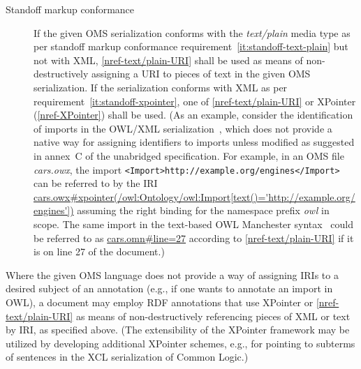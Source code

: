 \documentclass[10pt, a4paper]{isov2}
\makeatletter
\def\cleardoublepage{\clearpage%
        \if@twoside
            \ifodd\c@page\else
                \vspace*{\fill}
                \hfill
                \begin{center}
					
                \end{center}
                \vspace{\fill}
                \thispagestyle{empty}
                \newpage
                \if@twocolumn\hbox{}\newpage\fi
            \fi
        \fi
    }
\newcommand*{\eg}{e.g.,\@\xspace}
\newcommand*{\mimetype}[1]{\textit{#1}}
\newcommand*{\DOL}{\ensuremath{\mathsf{DOL}}\xspace}
\renewcommand{\noterefname}{note}
\renewcommand{\nref}[1]{\noterefname~\ref{#1}}
\renewcommand{\nref}[1]{\ref{nref-#1}}
\makeatother
\begin{document}
\begin{description}
\item[Standoff markup conformance] If the given OMS serialization conforms with the \mimetype{text/plain} media type as per standoff markup conformance requirement~\ref{it:standoff-text-plain} but not with XML, \nref{text/plain-URI} shall be used as means of non-destructively assigning a URI to pieces of text in the given OMS serialization.
If the serialization conforms with XML as per requirement~\ref{it:standoff-xpointer}, one of \nref{text/plain-URI} or XPointer (\nref{XPointer}) shall be used. { (As an example, consider the identification of imports in the OWL/XML serialization~\cite{W3C:owl2-xml-serialization}, which does not provide a native way for assigning identifiers to imports unless modified as suggested in annex~C of the unabridged specification.  For example, in an OMS file \textit{cars.owx}, the import \texttt{<Import>http://example.org/engines</Import>} can be referred to by the IRI \url{cars.owx\#xpointer(/owl:Ontology/owl:Import[text()='http://example.org/engines'])} assuming the right binding for the namespace prefix \textit{owl} in scope.
The same import in the text-based OWL Manchester syntax~\cite{W3C:owl2-manchester-syntax} could be referred to as \url{cars.omn\#line=27} according to \nref{text/plain-URI} if it is on line 27 of the document.)}
\end{description}

Where the given OMS language does not provide a way of assigning IRIs to a desired subject of an annotation (\eg if one wants to annotate an import in OWL), a document may employ RDF annotations that use XPointer or \nref{text/plain-URI} as means of non-destructively referencing pieces of XML or text by IRI, as specified above. (The extensibility of the XPointer framework may be utilized by developing additional XPointer schemes, \eg for pointing to subterms of sentences in the XCL serialization of Common Logic.)



\newpage
\clause{\DOL Semantics}\label{c:semantics}
\end{document}
